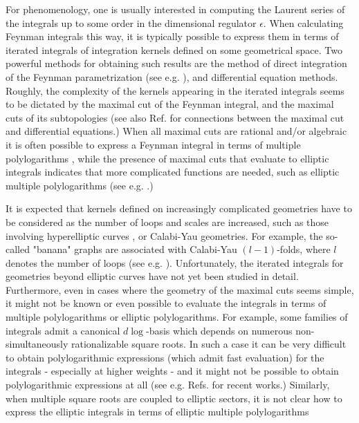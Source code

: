 \documentclass{article}
\begin{document}
For phenomenology, one is usually interested in computing the Laurent series of the integrals up to some order in the dimensional regulator $\epsilon$. When calculating Feynman integrals this way, it is typically possible to express them in terms of iterated integrals of integration kernels defined on some geometrical space. Two powerful methods for obtaining such results are the method of direct integration of the Feynman parametrization (see e.g. \cite{Brown:2009ta, Panzer:2014caa}), and differential equation methods. Roughly, the complexity of the kernels appearing in the iterated integrals seems to be dictated by the maximal cut of the Feynman integral, and the maximal cuts of its subtopologies (see also Ref. \cite{Primo:2016ebd} for connections between the maximal cut and differential equations.) When all maximal cuts are rational and/or algebraic it is often possible to express a Feynman integral in terms of multiple polylogarithms \cite{Goncharov:1998kja}, while the presence of maximal cuts that evaluate to elliptic integrals indicates that more complicated functions are needed, such as elliptic multiple polylogarithms (see e.g. \cite{brown2011multiple, Adams:2014vja, Broedel:2014vla, Broedel:2017kkb, Broedel:2017siw, Adams:2018yfj, Bogner:2019lfa}.)

It is expected that kernels defined on increasingly complicated geometries have to be considered as the number of loops and scales are increased, such as those involving hyperelliptic curves \cite{Zhang:2016hdb}, or Calabi-Yau geometries. For example, the so-called "banana" graphs are associated with Calabi-Yau $(l-1)$-folds, where $l$ denotes the number of loops (see e.g. \cite{Vanhove:2018mto, Klemm:2019dbm}). Unfortunately, the iterated integrals for geometries beyond elliptic curves have not yet been studied in detail. Furthermore, even in cases where the geometry of the maximal cuts seems simple, it might not be known or even possible to evaluate the integrals in terms of multiple polylogarithms or elliptic polylogarithms. For example, some families of integrals admit a canonical $d\log$-basis which depends on numerous non-simultaneously rationalizable square roots. In such a case it can be very difficult to obtain polylogarithmic expressions (which admit fast evaluation) for the integrals - especially at higher weights - and it might not be possible to obtain polylogarithmic expressions at all (see e.g. Refs. \cite{Besier:2018jen, Besier:2019kco, Heller:2019gkq, Besier:2020hjf, Brown:2020rda} for recent works.) Similarly, when multiple square roots are coupled to elliptic sectors, it is not clear how to express the elliptic integrals in terms of elliptic multiple polylogarithms
\end{document}
